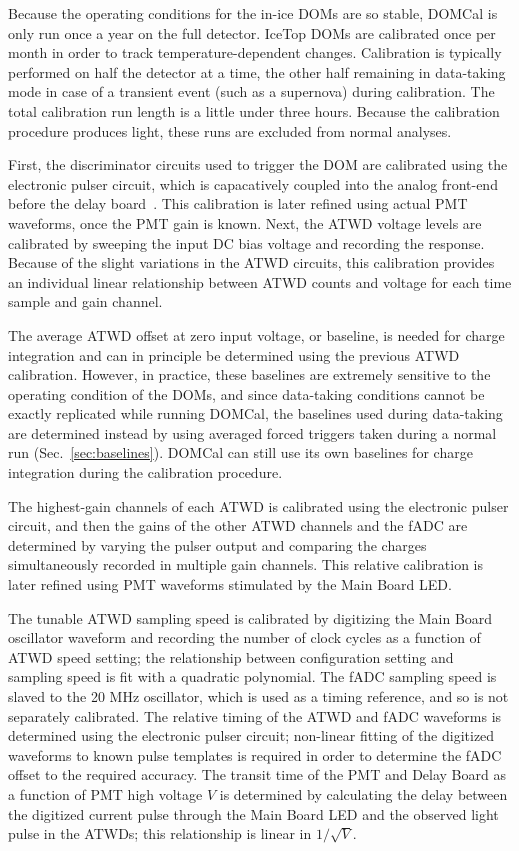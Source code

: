 Because the operating conditions for
the in-ice DOMs are so stable, DOMCal is only run once a year on the full
detector. IceTop DOMs are calibrated once per month in order to track
temperature-dependent changes.  Calibration is
typically performed on half the detector at a time, the other half
remaining in data-taking mode in case of a transient event (such as a
supernova) during calibration. The total calibration run length is a
little under three hours. Because the calibration procedure produces
light, these runs are excluded from normal analyses.

First, the discriminator circuits used to trigger the DOM are calibrated
using the electronic pulser circuit, which is capacatively coupled into the
analog front-end before the delay board~\cite{ICECUBE:DAQ}.  This
calibration is later refined using actual 
PMT waveforms, once the PMT gain is known.  Next, the ATWD voltage levels
are calibrated by sweeping the input DC bias voltage and recording the
response.  Because of the slight variations in the ATWD circuits, this
calibration provides an individual linear relationship between ATWD counts
and voltage for each time sample and gain channel.

The average ATWD offset at zero input voltage, or baseline, is needed for
charge integration and can in principle be determined using the previous
ATWD calibration. However, in
practice, these baselines are extremely sensitive to the operating
condition of the DOMs, and since data-taking conditions cannot be exactly
replicated while running DOMCal, the baselines used during data-taking are
determined instead by using averaged forced triggers taken during a normal
run (Sec.~\ref{sec:baselines}).  DOMCal can still use its own
baselines for charge integration during the calibration procedure.

The highest-gain channels of each ATWD is calibrated using the electronic
pulser circuit, and then the gains of the other ATWD channels and the fADC
are determined by varying the pulser output and comparing the charges
simultaneously recorded in multiple gain channels.  This relative
calibration is later refined using PMT waveforms stimulated by the Main
Board LED.

The tunable ATWD sampling speed is calibrated by digitizing the Main Board oscillator
waveform and recording the number of clock cycles as a function of ATWD
speed setting; the relationship between configuration setting and sampling
speed is fit with a quadratic polynomial.  The fADC sampling speed is
slaved to the 20 MHz oscillator, which is used as a timing reference, and
so is not separately calibrated.  The relative timing of 
the ATWD and fADC waveforms is determined using the electronic pulser circuit;
non-linear fitting of the digitized waveforms to known pulse templates is
required in order to determine the fADC offset to the required accuracy.
The transit time of the PMT and Delay Board as a function of PMT high
voltage $V$ is determined by calculating the delay between the digitized
current pulse through the Main Board LED and the observed light pulse in
the ATWDs; this relationship is linear in $1/\sqrt{V}$.

